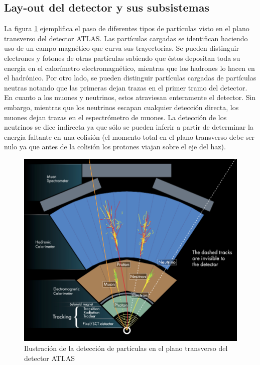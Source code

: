 \subsection{Lay-out del detector y sus subsistemas}\label{layout}

La figura  \ref{fig:Event} ejemplifica el paso de diferentes tipos de partículas visto en el plano transverso del detector ATLAS. Las partículas cargadas se identifican haciendo uso de un campo magnético que curva sus trayectorias. Se pueden distinguir electrones y fotones de otras partículas sabiendo que éstos depositan toda su energía en el calorímetro electromagnético, mientras que los hadrones lo hacen en el hadrónico. Por otro lado, se pueden distinguir partículas cargadas de partículas neutras notando que las primeras dejan trazas en el primer tramo del detector. En cuanto a los muones y neutrinos, estos atraviesan enteramente el detector. Sin embargo, mientras que los neutrinos escapan cualquier detección directa, los muones dejan trazas en el espectrómetro de muones. La detección de los neutrinos se dice indirecta ya que sólo se pueden inferir a partir de determinar la energía faltante en una colisión (el momento total en el plano transverso debe ser nulo ya que antes de la colisión los protones viajan sobre el eje del haz).\\

\begin{figure}[h]
    \centering
    \includegraphics[width =0.9\linewidth]{images/Event}
    \caption{Ilustración de la detección de partículas en el plano transverso del detector ATLAS\cite{Event}}
    \label{fig:Event}
\end{figure}


